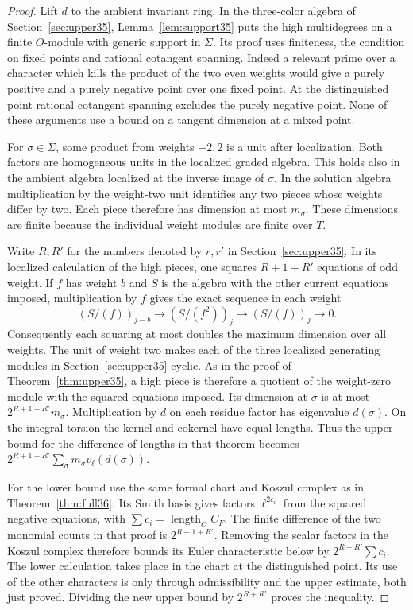 \documentclass[a4paper,11pt]{article}
\theoremstyle{definition}
\theoremstyle{remark}
\numberwithin{equation}{section}
\begin{document}
\begin{proof}
Lift \(d\) to the ambient invariant ring. In the three-color
algebra of Section~\ref{sec:upper35}, Lemma~\ref{lem:support35}
puts the high multidegrees on a finite \(O\)-module with generic
support in \(\Sigma\). Its proof uses finiteness, the condition
on fixed points and rational cotangent spanning. Indeed a relevant
prime over a character which kills the product of the two even
weights would give a purely positive and a purely negative point
over one fixed point. At the distinguished point rational
cotangent spanning excludes the purely negative point. None of
these arguments use a bound on a tangent dimension at a mixed
point.

For \(\sigma\in\Sigma\), some product from weights \(-2,2\)
is a unit after localization. Both factors are homogeneous units
in the localized graded algebra. This holds also in the ambient
algebra localized at the inverse image of \(\sigma\). In the
solution algebra multiplication by the weight-two unit identifies
any two pieces whose weights differ by two. Each piece therefore
has dimension at most \(m_\sigma\). These dimensions are finite
because the individual weight modules are finite over \(T\).

Write \(R,R'\) for the numbers denoted by \(r,r'\) in
Section~\ref{sec:upper35}. In its localized calculation of the
high pieces, one squares \(R+1+R'\) equations of odd weight.
If \(f\) has weight \(b\) and \(S\) is the algebra with the other
current equations imposed, multiplication by \(f\) gives the
exact sequence in each weight
\[
 (S/(f))_{j-b}\longrightarrow (S/(f^2))_j
                      \longrightarrow(S/(f))_j\longrightarrow0 .
\]
Consequently each squaring at most doubles the maximum dimension
over all weights. The unit of weight two makes each of the three
localized generating modules in Section~\ref{sec:upper35} cyclic.
As in the proof of Theorem~\ref{thm:upper35}, a high piece is
therefore a quotient of the weight-zero module with the squared
equations imposed. Its dimension at \(\sigma\) is at most
\(2^{R+1+R'}m_\sigma\). Multiplication by \(d\) on each residue
factor has eigenvalue \(d(\sigma)\). On the integral torsion the
kernel and cokernel have equal lengths. Thus the upper bound for
the difference of lengths in that theorem becomes
\(2^{R+1+R'}\sum_\sigma m_\sigma v_\ell(d(\sigma))\).

For the lower bound use the same formal chart and Koszul complex
as in Theorem~\ref{thm:full36}. Its Smith basis gives factors
\(\ell^{2c_i}\) from the squared negative equations, with
\(\sum c_i=\operatorname{length}_O C_F\). The finite difference of
the two monomial counts in that proof is \(2^{R-1+R'}\). Removing
the scalar factors in the Koszul complex therefore bounds its
Euler characteristic below by \(2^{R+R'}\sum c_i\). The lower
calculation takes place in the chart at the distinguished point.
Its use of the other characters is only through admissibility
and the upper estimate, both just proved. Dividing the new upper
bound by \(2^{R+R'}\) proves the inequality.
\end{proof}
\end{document}
